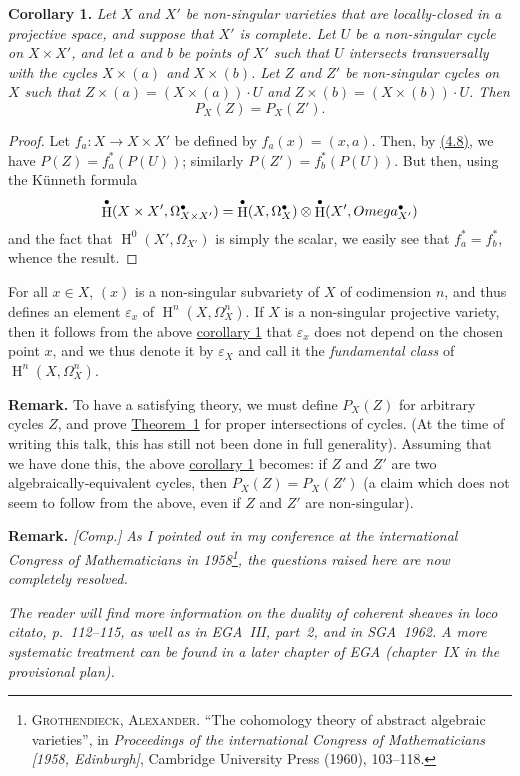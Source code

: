 \documentclass{article}
\newenvironment{itenv}[1]
  {\phantomsection\par\medskip\noindent\textbf{#1.}\itshape}
  {\medskip}
\newenvironment{rmenv}[1]
  {\phantomsection\par\medskip\noindent\textbf{#1.}\rmfamily}
  {\medskip}
\DeclareMathOperator{\HH}{H}
\newcommand{\oldpage}[1]{\marginpar{\footnotesize$\Big\vert$ \textit{p.~#1}}}
\begin{document}
\oldpage{149-13}
\begin{itenv}{Corollary 1}
\label{theorem1corollary1}
  Let $X$ and $X'$ be non-singular varieties that are locally-closed in a projective space, and suppose that $X'$ is complete.
  Let $U$ be a non-singular cycle on $X\times X'$, and let $a$ and $b$ be points of $X'$ such that $U$ intersects transversally with the cycles $X\times(a)$ and $X\times(b)$.
  Let $Z$ and $Z'$ be non-singular cycles on $X$ such that $Z\times(a)=(X\times(a))\cdot U$ and $Z\times(b)=(X\times(b))\cdot U$.
  Then
  \[
    P_X(Z) = P_X(Z').
  \]
\end{itenv}

\begin{proof}
  Let $f_a\colon X\to X\times X'$ be defined by $f_a(x)=(x,a)$.
  Then, by \hyperref[4.8]{(4.8)}, we have $P(Z)=f_a^*(P(U))$; similarly $P(Z')=f_b^*(P(U))$.
  But then, using the K\"{u}nneth formula
  \[
    \HH^\bullet(X\times X',\Omega_{X\times X'}^\bullet)
    = \HH^\bullet(X,\Omega_X^\bullet)\otimes\HH^\bullet(X',\\Omega_{X'}^\bullet)
  \]
  and the fact that $\HH^0(X',\Omega_{X'})$ is simply the scalar, we easily see that $f_a^*=f_b^*$, whence the result.
\end{proof}

For all $x\in X$, $(x)$ is a non-singular subvariety of $X$ of codimension $n$, and thus defines an element $\varepsilon_x$ of $\HH^n(X,\Omega_X^n)$.
If $X$ is a non-singular projective variety, then it follows from the above \hyperref[theorem1corollary1]{corollary 1} that $\varepsilon_x$ does not depend on the chosen point $x$, and we thus denote it by $\varepsilon_X$ and call it the \emph{fundamental class} of $\HH^n(X,\Omega_X^n)$.

\begin{rmenv}{Remark}
\label{section4remark}
  To have a satisfying theory, we must define $P_X(Z)$ for arbitrary cycles $Z$, and prove \hyperref[theorem1]{Theorem~1} for proper intersections of cycles.
  (At the time of writing this talk, this has still not been done in full generality).
  Assuming that we have done this, the above \hyperref[theorem1corollary1]{corollary 1} becomes: if $Z$ and $Z'$ are two algebraically-equivalent cycles, then $P_X(Z)=P_X(Z')$ (a claim which does not seem to follow from the above, even if $Z$ and $Z'$ are non-singular).
\end{rmenv}

\begin{rmenv}{Remark}
  \emph{[Comp.]}
  \emph{As I pointed out in my conference at the international Congress of Mathematicians in 1958\footnote{\textsc{Grothendieck, Alexander.} ``The cohomology theory of abstract algebraic varieties'', in \emph{Proceedings of the international Congress of Mathematicians [1958, Edinburgh]}, Cambridge University Press (1960), 103--118.}, the questions raised here are now completely resolved.}

  \emph{The reader will find more information on the duality of coherent sheaves in \emph{loco citato}, p.~112--115, as well as in EGA~III, part~2, and in SGA~1962.}
  \emph{A more systematic treatment can be found in a later chapter of EGA (chapter~IX in the provisional plan).}
\end{rmenv}
\end{document}
